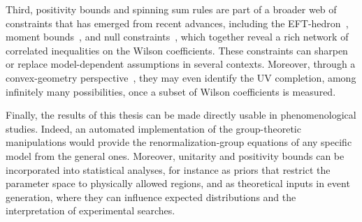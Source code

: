 Third, positivity bounds and spinning sum rules are part of a broader web of constraints that has emerged from recent advances, including the
EFT-hedron~\cite{Arkani-Hamed:2020blm}, moment bounds~\cite{Bellazzini:2020cot}, and null
constraints~\cite{Caron-Huot:2020cmc,Caron-Huot:2021rmr,Tolley:2020gtv}, which together reveal a
rich network of correlated inequalities on the Wilson coefficients. These constraints can sharpen or
replace model-dependent assumptions in several contexts. Moreover, through a convex-geometry
perspective~\cite{Zhang:2020jyn}, they may even identify the UV completion, among infinitely many
possibilities, once a subset of Wilson coefficients is measured.

Finally, the results of this thesis can be made directly usable in phenomenological studies. Indeed,
an automated implementation of the group-theoretic manipulations would provide the
renormalization-group equations of any specific model from the general ones. Moreover, unitarity and
positivity bounds can be incorporated into statistical analyses, for instance as priors that
restrict the parameter space to physically allowed regions, and as theoretical inputs in event
generation, where they can influence expected distributions and the interpretation of experimental
searches.